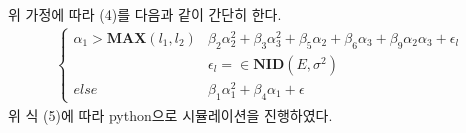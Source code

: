 \documentclass{article}
\begin{document}
    위 가정에 따라 (4)를 다음과 같이 간단히 한다.
    \begin{align}
        \left\{\begin{matrix}
            \alpha_1>\mathbf{MAX}(l_1,l_2) & \beta_2\alpha_2^2+\beta_3\alpha_3^2+\beta_5\alpha_2+\beta_6\alpha_3+\beta_9\alpha_2\alpha_3+\epsilon_l \\ & \epsilon_l = \in \mathbf{NID}(E,\sigma^2)\\
            else & \beta_1\alpha_1^2+\beta_4\alpha_1+\epsilon
        \end{matrix}\right.
    \end{align}
    위 식 (5)에 따라 python으로 시뮬레이션을 진행하였다. 
\end{document}
